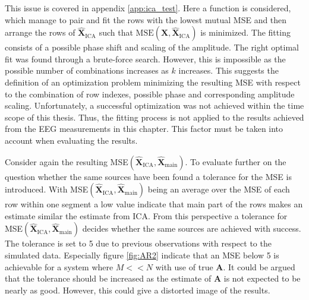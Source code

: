 This issue is covered in appendix \ref{app:ica_test}. 
Here a function is considered, which manage to pair and fit the rows with the lowest mutual MSE and then arrange the rows of $\hat{\mathbf{X}}_{\text{ICA}}$ such that $\text{MSE}(\mathbf{X}, \hat{\textbf{X}}_{\text{ICA}})$ is minimized. 
The fitting consists of a possible phase shift and scaling of the amplitude. 
The right optimal fit was found through a brute-force search. However, this is impossible as the possible number of combinations increases as $k$ increases. 
This suggests the definition of an optimization problem minimizing the resulting MSE with respect to the combination of row indexes, possible phase and corresponding amplitude scaling. 
Unfortunately, a successful optimization was not achieved within the time scope of this thesis.
Thus, the fitting process is not applied to the results achieved from the EEG measurements in this chapter. 
This factor must be taken into account when evaluating the results.

Consider again the resulting MSE$(\hat{\mathbf{X}}_{\text{ICA}}, \hat{\mathbf{X}}_{\text{main}})$. 
To evaluate further on the question whether the same sources have been found a tolerance for the MSE is introduced. 
With MSE$(\hat{\mathbf{X}}_{\text{ICA}}, \hat{\mathbf{X}}_{\text{main}})$ being an average over the MSE of each row within one segment a low value indicate that main part of the rows makes an estimate similar the estimate from ICA. 
From this perspective a tolerance for MSE$(\hat{\mathbf{X}}_{\text{ICA}}, \hat{\mathbf{X}}_{\text{main}})$ decides whether the same sources are achieved with success. 
The tolerance is set to 5 due to previous observations with respect to the simulated data. Especially figure \ref{fig:AR2} indicate that an MSE below 5 is achievable for a system where $M << N$ with use of true $\mathbf{A}$. 
It could be argued that the tolerance should be increased as the estimate of $\mathbf{A}$ is not expected to be nearly as good. 
However, this could give a distorted image of the results.    

